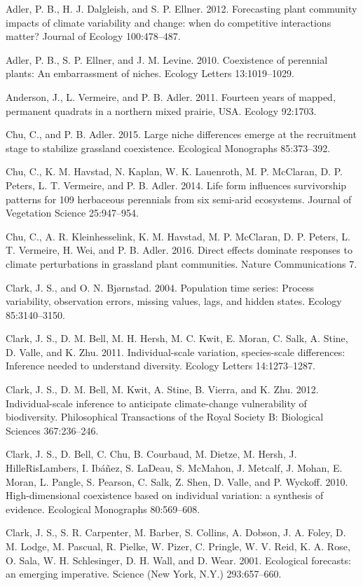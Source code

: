 \documentclass[12pt,]{article}
\begin{document}
Adler, P. B., H. J. Dalgleish, and S. P. Ellner. 2012. Forecasting plant
community impacts of climate variability and change: when do competitive
interactions matter? Journal of Ecology 100:478--487.

Adler, P. B., S. P. Ellner, and J. M. Levine. 2010. Coexistence of
perennial plants: An embarrassment of niches. Ecology Letters
13:1019--1029.

Anderson, J., L. Vermeire, and P. B. Adler. 2011. Fourteen years of
mapped, permanent quadrats in a northern mixed prairie, USA. Ecology
92:1703.

Chu, C., and P. B. Adler. 2015. Large niche differences emerge at the
recruitment stage to stabilize grassland coexistence. Ecological
Monographs 85:373--392.

Chu, C., K. M. Havstad, N. Kaplan, W. K. Lauenroth, M. P. McClaran, D.
P. Peters, L. T. Vermeire, and P. B. Adler. 2014. Life form influences
survivorship patterns for 109 herbaceous perennials from six semi-arid
ecosystems. Journal of Vegetation Science 25:947--954.

Chu, C., A. R. Kleinhesselink, K. M. Havstad, M. P. McClaran, D. P.
Peters, L. T. Vermeire, H. Wei, and P. B. Adler. 2016. Direct effects
dominate responses to climate perturbations in grassland plant
communities. Nature Communications 7.

Clark, J. S., and O. N. Bj{ø}rnstad. 2004. Population time series:
Process variability, observation errors, missing values, lags, and
hidden states. Ecology 85:3140--3150.

Clark, J. S., D. M. Bell, M. H. Hersh, M. C. Kwit, E. Moran, C. Salk, A.
Stine, D. Valle, and K. Zhu. 2011. Individual-scale variation,
species-scale differences: Inference needed to understand diversity.
Ecology Letters 14:1273--1287.

Clark, J. S., D. M. Bell, M. Kwit, A. Stine, B. Vierra, and K. Zhu.
2012. Individual-scale inference to anticipate climate-change
vulnerability of biodiversity. Philosophical Transactions of the Royal
Society B: Biological Sciences 367:236--246.

Clark, J. S., D. Bell, C. Chu, B. Courbaud, M. Dietze, M. Hersh, J.
HilleRisLambers, I. Ib{á}{ñ}ez, S. LaDeau, S. McMahon, J. Metcalf, J.
Mohan, E. Moran, L. Pangle, S. Pearson, C. Salk, Z. Shen, D. Valle, and
P. Wyckoff. 2010. High-dimensional coexistence based on individual
variation: a synthesis of evidence. Ecological Monographs 80:569--608.

Clark, J. S., S. R. Carpenter, M. Barber, S. Collins, A. Dobson, J. A.
Foley, D. M. Lodge, M. Pascual, R. Pielke, W. Pizer, C. Pringle, W. V.
Reid, K. A. Rose, O. Sala, W. H. Schlesinger, D. H. Wall, and D. Wear.
2001. Ecological forecasts: an emerging imperative. Science (New York,
N.Y.) 293:657--660.
\end{document}
